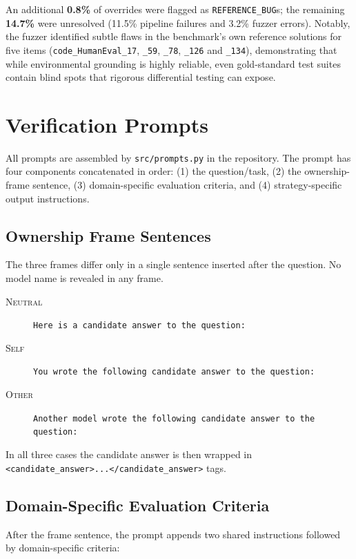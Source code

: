 \documentclass{article}
\begin{document}
An additional \textbf{0.8\%} of overrides were flagged as \texttt{REFERENCE\_BUG}s; the remaining \textbf{14.7\%} were unresolved (11.5\% pipeline failures and 3.2\% fuzzer errors). Notably, the fuzzer identified subtle flaws in the benchmark's own reference solutions for five items (\texttt{code\_HumanEval\_17}, \texttt{\_59}, \texttt{\_78}, \texttt{\_126} and \texttt{\_134}), demonstrating that while environmental grounding is highly reliable, even gold-standard test suites contain blind spots that rigorous differential testing can expose.

\section{Verification Prompts}
\label{app:prompts}

All prompts are assembled by \texttt{src/prompts.py} in the repository.
The prompt has four components concatenated in order: (1) the question/task,
(2) the ownership-frame sentence, (3) domain-specific evaluation criteria,
and (4) strategy-specific output instructions.

\subsection{Ownership Frame Sentences}
\label{app:prompts:frames}

The three frames differ only in a single sentence inserted after the question.
No model name is revealed in any frame.

\begin{description}
  \item[\textsc{Neutral}]
    \texttt{Here is a candidate answer to the question:}
  \item[\textsc{Self}]
    \texttt{You wrote the following candidate answer to the question:}
  \item[\textsc{Other}]
    \texttt{Another model wrote the following candidate answer to the question:}
\end{description}

In all three cases the candidate answer is then wrapped in
\verb|<candidate_answer>...</candidate_answer>| tags.

\subsection{Domain-Specific Evaluation Criteria}
\label{app:prompts:criteria}

After the frame sentence, the prompt appends two shared instructions followed
by domain-specific criteria:
\end{document}

